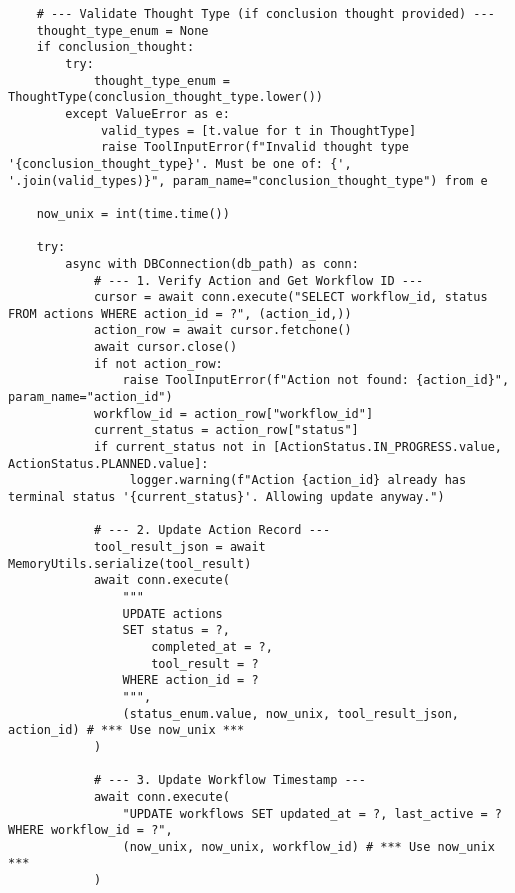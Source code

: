 \documentclass[12pt,a4paper]{article}
\begin{document}
\begin{pageablecode}
\begin{verbatim}
    # --- Validate Thought Type (if conclusion thought provided) ---
    thought_type_enum = None
    if conclusion_thought:
        try:
            thought_type_enum = ThoughtType(conclusion_thought_type.lower())
        except ValueError as e:
             valid_types = [t.value for t in ThoughtType]
             raise ToolInputError(f"Invalid thought type '{conclusion_thought_type}'. Must be one of: {', '.join(valid_types)}", param_name="conclusion_thought_type") from e

    now_unix = int(time.time())

    try:
        async with DBConnection(db_path) as conn:
            # --- 1. Verify Action and Get Workflow ID ---
            cursor = await conn.execute("SELECT workflow_id, status FROM actions WHERE action_id = ?", (action_id,))
            action_row = await cursor.fetchone()
            await cursor.close()
            if not action_row:
                raise ToolInputError(f"Action not found: {action_id}", param_name="action_id")
            workflow_id = action_row["workflow_id"]
            current_status = action_row["status"]
            if current_status not in [ActionStatus.IN_PROGRESS.value, ActionStatus.PLANNED.value]:
                 logger.warning(f"Action {action_id} already has terminal status '{current_status}'. Allowing update anyway.")

            # --- 2. Update Action Record ---
            tool_result_json = await MemoryUtils.serialize(tool_result)
            await conn.execute(
                """
                UPDATE actions
                SET status = ?,
                    completed_at = ?,
                    tool_result = ?
                WHERE action_id = ?
                """,
                (status_enum.value, now_unix, tool_result_json, action_id) # *** Use now_unix ***
            )

            # --- 3. Update Workflow Timestamp ---
            await conn.execute(
                "UPDATE workflows SET updated_at = ?, last_active = ? WHERE workflow_id = ?",
                (now_unix, now_unix, workflow_id) # *** Use now_unix ***
            )


\end{verbatim}
\end{pageablecode}
\end{document}
